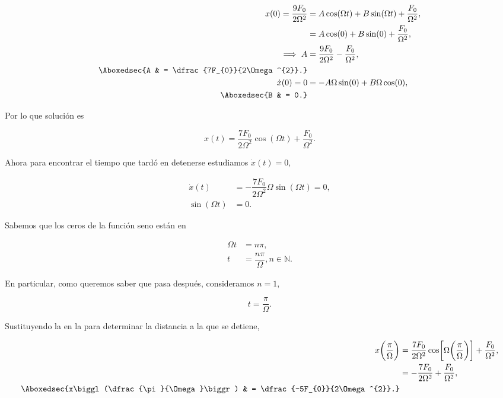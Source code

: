 \documentclass[../main.tex]{subfiles}
\begin{document}
\begin{align*}
	x(0) = \dfrac{9F_{0}}{2\Omega^{2}} & = A\cos(\Omega t) + B\sin(\Omega t) + \dfrac{F_{0}}{\Omega^{2}}, \nonumber \\
	                                   & = A\cos(0) + B\sin(0) + \dfrac{F_{0}}{\Omega^{2}},              \nonumber  \\
	\Longrightarrow\; A                & = \dfrac{9F_{0}}{2\Omega^{2}} - \dfrac{F_{0}}{\Omega^{2}},       \nonumber \\
	\Aboxedsec{A                       & = \dfrac{7F_{0}}{2\Omega^{2}}.}                                            \\
	\dot{x}(0) = 0                     & = -A\Omega\sin(0) + B\Omega\cos(0),                                        \\
	\Aboxedsec{B                       & = 0.}
\end{align*}

Por lo que solución es

\begin{equation}
	x(t) = \dfrac{7F_{0}}{2\Omega^{2}}\cos(\Omega t) + \dfrac{F_{0}}{\Omega^{2}}.
	\label{eq:sol-less-gral}
\end{equation}

Ahora para encontrar el tiempo que tardó en detenerse
estudiamos \(\dot{x}(t) = 0\),

\begin{align*}
	\dot{x}(t)     & = -\dfrac{7F_{0}}{2\Omega^{2}}\Omega\sin(\Omega t) = 0, \\
	\sin(\Omega t) & = 0.
\end{align*}

Sabemos que los ceros de la función seno están en

\begin{align*}
	\Omega t & = n\pi,                                 \\
	t        & = \dfrac{n\pi}{\Omega}, n\in\mathbb{N}.
\end{align*}

En particular, como queremos saber que pasa después, consideramos \(n = 1\),

\begin{equation}
	t = \dfrac{\pi}{\Omega}.
	\label{eq:t-1st-left}
\end{equation}

Sustituyendo la  en la 
para determinar la distancia a la que se detiene,

\begin{align*}
	x \biggl(\dfrac{\pi}{\Omega}\biggr)           & = \dfrac{7F_{0}}{2\Omega^{2}}\cos \biggl[\Omega\biggl(\dfrac{\pi}{\Omega}\biggr)\biggr] + \dfrac{F_{0}}{\Omega^{2}}, \\
	                                              & = -\dfrac{7F_{0}}{2\Omega^{2}} + \dfrac{F_{0}}{\Omega^{2}},                                                          \\
	\Aboxedsec{x\biggl(\dfrac{\pi}{\Omega}\biggr) & = \dfrac{-5F_{0}}{2\Omega^{2}}.}
\end{align*}
\end{document}
